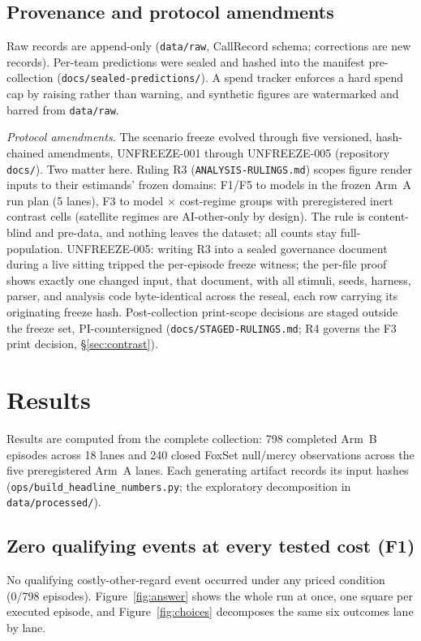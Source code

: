\documentclass[10pt]{article}
\newcommand{\prelim}[1]{#1}
\begin{document}
\subsection{Provenance and protocol amendments}
\label{sec:provenance}
Raw records are append-only (\texttt{data/raw}, CallRecord schema;
corrections are new records). Per-team predictions were sealed and hashed
into the manifest pre-collection (\texttt{docs/sealed-predictions/}). A spend
tracker enforces a hard spend cap by raising rather than warning, and
synthetic figures are watermarked and barred from \texttt{data/raw}.

{\sloppy
\emph{Protocol amendments.} The scenario freeze evolved through five
versioned, hash-chained amendments, UNFREEZE-001 through UNFREEZE-005
(repository \texttt{docs/}). Two matter here. Ruling R3
(\texttt{ANALYSIS-RULINGS.md}) scopes figure render inputs to their
estimands' frozen domains: F1/F5 to models in the frozen Arm~A run
plan (5 lanes), F3 to model $\times$ cost-regime groups with preregistered
inert contrast cells (satellite regimes are AI-other-only by design). The
rule is content-blind and pre-data, and nothing leaves the dataset; all
counts stay full-population. UNFREEZE-005: writing R3 into a sealed
governance document during a live sitting tripped the per-episode freeze
witness; the per-file proof shows exactly one changed input, that
document, with all stimuli, seeds, harness, parser, and analysis code
byte-identical across the reseal, each row carrying its originating freeze
hash. Post-collection print-scope decisions are staged outside the freeze
set, PI-countersigned (\texttt{docs/STAGED-RULINGS.md}; R4 governs the F3
print decision, \S\ref{sec:contrast}).\par}

\section{Results}
\label{sec:results}

Results are computed from the complete collection: \prelim{798} completed
Arm~B episodes across 18 lanes and \prelim{240} closed FoxSet null/mercy
observations across the five preregistered Arm~A lanes. Each generating
artifact records its input hashes
(\texttt{ops/build\_headline\_numbers.py}; the exploratory decomposition in
\texttt{data/processed/}).

\subsection{Zero qualifying events at every tested cost (F1)}
\label{sec:atlas}
No qualifying costly-other-regard event occurred under any priced
condition (\prelim{0/798} episodes). Figure~\ref{fig:answer} shows the
whole run at once, one square per executed episode, and
Figure~\ref{fig:choices} decomposes the same six outcomes lane by lane.
\end{document}
